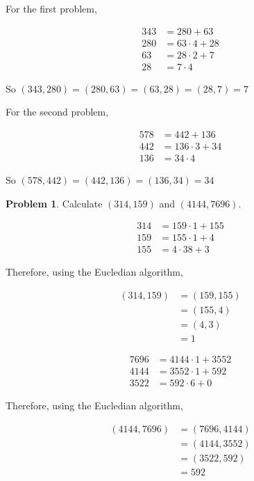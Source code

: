 \documentclass{article}
\theoremstyle{definition}
\newtheorem{problem}{Problem}[section]
\begin{document}
  For the first problem,
  
  \begin{align*}
    343 &= 280 + 63 \\
    280 &= 63 \cdot 4 + 28 \\
    63 &= 28 \cdot 2 + 7 \\
    28 &= 7 \cdot 4
  \end{align*}
  
  So $(343, 280) = (280, 63) = (63, 28) = (28, 7) = 7$
  
  For the second problem,
  
  \begin{align*}
    578 &= 442 + 136 \\
    442 &= 136 \cdot 3 + 34 \\
    136 &= 34 \cdot 4
  \end{align*}
  
  So $(578, 442) = (442, 136) = (136, 34) = 34$
  
  \begin{problem}
    Calculate $(314, 159)$ and $(4144, 7696)$.
  \end{problem}
  
  \begin{align*}
    314 &= 159 \cdot 1 + 155 \\
    159 &= 155 \cdot 1 + 4 \\
    155 &= 4 \cdot 38 + 3
  \end{align*}
  
  Therefore, using the Eucledian algorithm,
  
  \begin{align*}
    (314, 159) &= (159, 155) \\
    &= (155, 4) \\
    &= (4, 3) \\
    &= 1
  \end{align*}
  
  \begin{align*}
    7696 &= 4144 \cdot 1 + 3552 \\
    4144 &= 3552 \cdot 1 + 592 \\
    3522 &= 592 \cdot 6 + 0
  \end{align*}
  
  Therefore, using the Eucledian algorithm,
  
  \begin{align*}
    (4144, 7696) &= (7696, 4144) \\
    &= (4144, 3552) \\
    &= (3522, 592) \\
    &= 592
  \end{align*}
  
\end{document}
